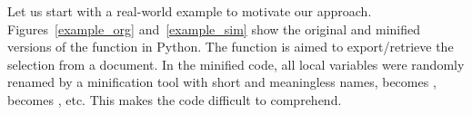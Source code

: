 


Let us start with a real-world example to motivate our approach.
Figures~\ref{example_org} and~\ref{example_sim} show the original and
minified versions of the function  in Python.
The function is aimed to export/retrieve the selection from a
document.
%
In the minified code, all local variables were randomly renamed by a
minification tool with short and meaningless names, \eg {}
becomes ,  becomes , etc.
This makes the code difficult to comprehend.


